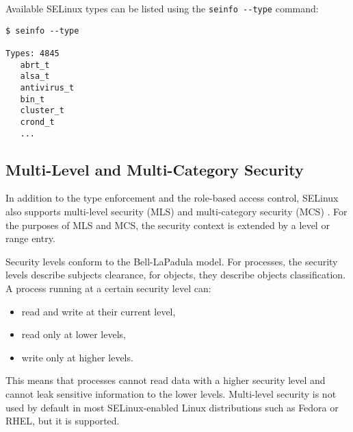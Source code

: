 Available SELinux types can be listed using the \texttt{seinfo -{}-type}
command:
\begin{lstlisting}
$ seinfo --type

Types: 4845
   abrt_t
   alsa_t
   antivirus_t
   bin_t
   cluster_t
   crond_t
   ...
\end{lstlisting}

\subsection{Multi-Level and Multi-Category Security}
\label{mls}
In addition to the type enforcement and the role-based access control, SELinux
also supports multi-level security (MLS) and multi-category security (MCS)
\cite[pp.~48--53]{tsn}. For the purposes of MLS and MCS, the security context is
extended by a level or range entry.

Security levels conform to the Bell-LaPadula model. For processes, the security
levels describe subjects clearance, for objects, they describe objects
classification. A process running at a certain security level can:
\begin{itemize}
    \item read and write at their current level,
    \item read only at lower levels,
    \item write only at higher levels.
\end{itemize}
This means that processes cannot read data with a higher security level and
cannot leak sensitive information to the lower levels. Multi-level security is
not used by default in most SELinux-enabled Linux distributions such as Fedora
or RHEL, but it is supported.

